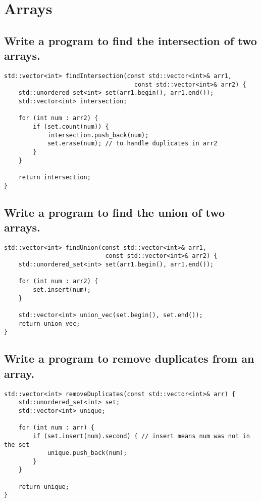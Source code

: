 \section{Arrays}

\subsection{Write a program to find the intersection of two arrays.}
\begin{tcolorbox}[title=]
\begin{verbatim}
std::vector<int> findIntersection(const std::vector<int>& arr1, 
                                    const std::vector<int>& arr2) {
    std::unordered_set<int> set(arr1.begin(), arr1.end());
    std::vector<int> intersection;

    for (int num : arr2) {
        if (set.count(num)) {
            intersection.push_back(num);
            set.erase(num); // to handle duplicates in arr2
        }
    }

    return intersection;
}
\end{verbatim}
\end{tcolorbox}

\subsection{Write a program to find the union of two arrays.}
\begin{tcolorbox}[title=]
\begin{verbatim}
std::vector<int> findUnion(const std::vector<int>& arr1, 
                            const std::vector<int>& arr2) {
    std::unordered_set<int> set(arr1.begin(), arr1.end());

    for (int num : arr2) {
        set.insert(num);
    }

    std::vector<int> union_vec(set.begin(), set.end());
    return union_vec;
}    
\end{verbatim}
\end{tcolorbox}

\subsection{Write a program to remove duplicates from an array.}
\begin{tcolorbox}[title=]
\begin{verbatim}
std::vector<int> removeDuplicates(const std::vector<int>& arr) {
    std::unordered_set<int> set;
    std::vector<int> unique;

    for (int num : arr) {
        if (set.insert(num).second) { // insert means num was not in the set
            unique.push_back(num);
        }
    }

    return unique;
}
\end{verbatim}
\end{tcolorbox}

